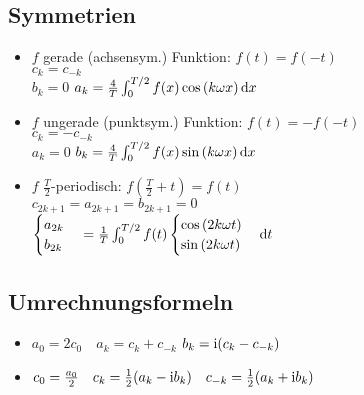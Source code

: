 \documentclass[german,color,5pt]{latex4ei/latex4ei_fs}
\begin{document}
\begin{sectionbox}
	\subsection{Symmetrien}
	\begin{itemize}
		\item $f$ gerade (achsensym.) Funktion: $f(t) = f(-t)$\\
		$c_k = c_{-k}$\\
		$b_k = 0$ \qquad $a_k = \frac{4}{T} \int_{0}^{T/2} f(x) \cos \left(k \omega x \right) \diff x$
		\item $f$ ungerade (punktsym.) Funktion: $f(t) = -f(-t)$\\
		$c_k = -c_{-k}$\\
		$a_k = 0$ \qquad $ b_k = \frac{4}{T} \int_{0}^{T/2} f(x) \sin \left(k \omega x \right) \diff x$
		\item $f$ $\frac{T}{2}$-periodisch: $f(\frac{T}{2} + t) = f(t)$\\
		$c_{2k+1} = a_{2k+1} = b_{2k+1} = 0$\\
		$\begin{cases} a_{2k}\\ b_{2k} \end{cases} = \frac{1}{T}\int_0^{T/2}f(t)\begin{cases} \cos{(2k \omega t)}\\ \sin{(2k \omega t)} \end{cases} \diff t$
	\end{itemize}
\end{sectionbox}

\begin{sectionbox}
	\subsection{Umrechnungsformeln}
	\begin{itemize}
		\item $a_0 = 2 c_0 \quad a_k = c_k + c_{-k}$  \quad $b_k = \mathrm{i} (c_k - c_{-k})$
		\item $c_0 = \frac{a_0}{2} \quad c_k = \frac12(a_k - \mathrm{i} b_k) \quad c_{-k} = \frac12(a_k + \mathrm{i} b_k)$
	\end{itemize}
\end{sectionbox}
\end{document}
